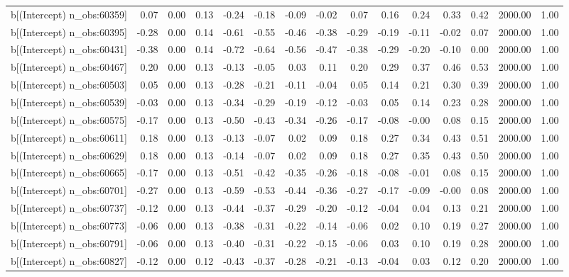 \begin{table}[ht]
\begin{tabular}{rrrrrrrrrrrrrrr}
  b[(Intercept) n\_obs:60359] & 0.07 & 0.00 & 0.13 & -0.24 & -0.18 & -0.09 & -0.02 & 0.07 & 0.16 & 0.24 & 0.33 & 0.42 & 2000.00 & 1.00 \\ 
  b[(Intercept) n\_obs:60395] & -0.28 & 0.00 & 0.14 & -0.61 & -0.55 & -0.46 & -0.38 & -0.29 & -0.19 & -0.11 & -0.02 & 0.07 & 2000.00 & 1.00 \\ 
  b[(Intercept) n\_obs:60431] & -0.38 & 0.00 & 0.14 & -0.72 & -0.64 & -0.56 & -0.47 & -0.38 & -0.29 & -0.20 & -0.10 & 0.00 & 2000.00 & 1.00 \\ 
  b[(Intercept) n\_obs:60467] & 0.20 & 0.00 & 0.13 & -0.13 & -0.05 & 0.03 & 0.11 & 0.20 & 0.29 & 0.37 & 0.46 & 0.53 & 2000.00 & 1.00 \\ 
  b[(Intercept) n\_obs:60503] & 0.05 & 0.00 & 0.13 & -0.28 & -0.21 & -0.11 & -0.04 & 0.05 & 0.14 & 0.21 & 0.30 & 0.39 & 2000.00 & 1.00 \\ 
  b[(Intercept) n\_obs:60539] & -0.03 & 0.00 & 0.13 & -0.34 & -0.29 & -0.19 & -0.12 & -0.03 & 0.05 & 0.14 & 0.23 & 0.28 & 2000.00 & 1.00 \\ 
  b[(Intercept) n\_obs:60575] & -0.17 & 0.00 & 0.13 & -0.50 & -0.43 & -0.34 & -0.26 & -0.17 & -0.08 & -0.00 & 0.08 & 0.15 & 2000.00 & 1.00 \\ 
  b[(Intercept) n\_obs:60611] & 0.18 & 0.00 & 0.13 & -0.13 & -0.07 & 0.02 & 0.09 & 0.18 & 0.27 & 0.34 & 0.43 & 0.51 & 2000.00 & 1.00 \\ 
  b[(Intercept) n\_obs:60629] & 0.18 & 0.00 & 0.13 & -0.14 & -0.07 & 0.02 & 0.09 & 0.18 & 0.27 & 0.35 & 0.43 & 0.50 & 2000.00 & 1.00 \\ 
  b[(Intercept) n\_obs:60665] & -0.17 & 0.00 & 0.13 & -0.51 & -0.42 & -0.35 & -0.26 & -0.18 & -0.08 & -0.01 & 0.08 & 0.15 & 2000.00 & 1.00 \\ 
  b[(Intercept) n\_obs:60701] & -0.27 & 0.00 & 0.13 & -0.59 & -0.53 & -0.44 & -0.36 & -0.27 & -0.17 & -0.09 & -0.00 & 0.08 & 2000.00 & 1.00 \\ 
  b[(Intercept) n\_obs:60737] & -0.12 & 0.00 & 0.13 & -0.44 & -0.37 & -0.29 & -0.20 & -0.12 & -0.04 & 0.04 & 0.13 & 0.21 & 2000.00 & 1.00 \\ 
  b[(Intercept) n\_obs:60773] & -0.06 & 0.00 & 0.13 & -0.38 & -0.31 & -0.22 & -0.14 & -0.06 & 0.02 & 0.10 & 0.19 & 0.27 & 2000.00 & 1.00 \\ 
  b[(Intercept) n\_obs:60791] & -0.06 & 0.00 & 0.13 & -0.40 & -0.31 & -0.22 & -0.15 & -0.06 & 0.03 & 0.10 & 0.19 & 0.28 & 2000.00 & 1.00 \\ 
  b[(Intercept) n\_obs:60827] & -0.12 & 0.00 & 0.12 & -0.43 & -0.37 & -0.28 & -0.21 & -0.13 & -0.04 & 0.03 & 0.12 & 0.20 & 2000.00 & 1.00 \\ 

\end{tabular}
\end{table}
